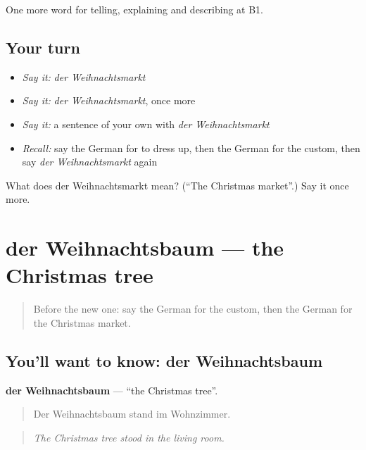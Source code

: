 \begin{grammarlens}[title={What you've built}]
One more word for telling, explaining and describing at B1.
\end{grammarlens}

\subsection*{Your turn}
\begin{itemize}
\raggedright
  \item \emph{Say it:} \emph{der Weihnachtsmarkt}
  \item \emph{Say it:} \emph{der Weihnachtsmarkt}, once more
  \item \emph{Say it:} a sentence of your own with \emph{der Weihnachtsmarkt}
  \item \emph{Recall:} say the German for to dress up, then the German for the custom, then say \emph{der Weihnachtsmarkt} again
\end{itemize}

\begin{tcolorbox}[breakable,colback=teal!4,colframe=teal!35!black,title={Before you move on}]
What does der Weihnachtsmarkt mean? (\textquotedblleft{}The Christmas market\textquotedblright{}.) Say it once more.
\end{tcolorbox}
\section[der Weihnachtsbaum]{der Weihnachtsbaum — the Christmas tree}

\label{lesson:GE-C311-weihnachtsbaum}



\begin{quote}
Before the new one: say the German for the custom, then the German for the Christmas market.
\end{quote}

\subsection*{You'll want to know: der Weihnachtsbaum}
\textbf{der Weihnachtsbaum} — \textquotedblleft{}the Christmas tree\textquotedblright{}.

\begin{quote}
Der Weihnachtsbaum stand im Wohnzimmer.
\end{quote}

\begin{quote}
\emph{The Christmas tree stood in the living room.}
\end{quote}

